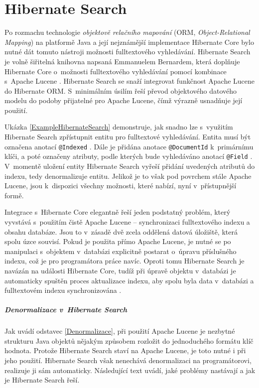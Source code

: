 \documentclass[11pt,oneside]{fithesis2}
\begin{document}
\section{Hibernate Search}
Po rozmachu technologie \emph{objektově relačního mapování} (ORM, \emph{Object-Relational Mapping}) na platformě Java a její nejznámější implementace Hibernate Core \cite[s.~29]{HibernateSearchAction} bylo nutné dát tomuto nástroji možnosti fulltextového vyhledávání. Hibernate Search je volně šiřitelná knihovna napsaná Emmanuelem Bernardem, která doplňuje Hibernate Core o~možnosti fulltextového vyhledávání pomocí kombinace s~Apache Lucene  \cite[s.~29]{HibernateSearchAction}. Hibernate Search se snaží integrovat funkčnost Apache Lucene do Hibernate ORM. S~minimálním úsilím řeší převod objektového datového modelu do podoby přijatelné pro Apache Lucene, čímž výrazně usnadňuje její použití.

Ukázka \ref{ExampleHibernateSearch} demonstruje, jak snadno lze s~využitím Hibernate Search zpřístupnit entitu pro fulltextové vyhledávání. Entita musí být označena anotací \texttt{@Indexed}  \cite[s.~38]{HibernateSearchAction}. Dále je přidána anotace \texttt{@DocumentId} k~primárnímu klíči, a poté označeny atributy, podle kterých bude vyhledáváno anotací \texttt{@Field}  \cite[s.~38]{HibernateSearchAction}. V~momentě uložení entity Hibernate Search vyřeší přidání uvedených atributů do indexu, tedy denormalizuje entitu. Jelikož je to však pod povrchem stále Apache Lucene, jsou k~dispozici všechny možnosti, které nabízí, nyní v~přístupnější formě.

Integrace s~Hibernate Core elegantně řeší jeden podstatný problém, který vyvstává s~použitím čistě Apache Lucene -- synchronizaci fulltextového indexu a obsahu databáze. Jsou to v~zásadě dvě zcela oddělená datová úložiště, která spolu úzce souvisí. Pokud je použita přímo Apache Lucene, je nutné se po manipulaci s~objektem v~databázi explicitně postarat o~úpravu příslušného indexu, což je pro programátora práce navíc. Oproti tomu Hibernate Search je navázán na události Hibernate Core, tudíž při úpravě objektu v~databázi je automaticky spuštěn proces aktualizace indexu, aby spolu byla data v~databázi a fulltextovém indexu synchronizována  \cite[s.~24]{HibernateSearchAction}. 

\subparagraph{Denormalizace v~Hibernate Search} 
\label{HibernateSearchDenormalizace}
Jak uvádí odstavec \ref{Denormalizace}, při použití Apache Lucene je nezbytné strukturu Java objektů nějakým způsobem rozložit do jednoduchého formátu klíč hodnota. Protože Hibernate Search staví na Apache Lucene, je toto nutné i při jeho použití. Hibernate Search však nenechává denormalizaci na programátorovi, realizuje ji sám automaticky. Následující text uvádí, jaké problémy nastávají a jak je Hibernate Search řeší.
\end{document}
